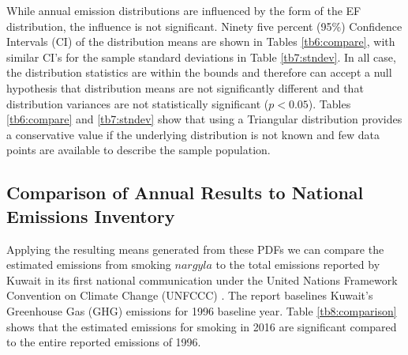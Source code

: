 \begin{table}[]
\centering
\caption{Comparison of annual total emission standard deviations.}
\label{tb7:stndev}
\end{table}

While annual emission distributions are influenced by the form of the EF distribution, the influence is not significant. Ninety five percent (95\%) Confidence Intervals (CI) of the distribution means are shown in Tables \ref{tb6:compare}, with similar CI’s for the sample standard deviations in Table \ref{tb7:stndev}. In all case, the distribution statistics are within the bounds and therefore can accept a null hypothesis that distribution means are not significantly different and that distribution variances are not statistically significant ($p<0.05$).  Tables \ref{tb6:compare} and \ref{tb7:stndev} show that using a Triangular distribution provides a conservative value if the underlying distribution is not known and few data points are available to describe the sample population.  

\subsection{Comparison of Annual Results to National Emissions Inventory}
Applying the resulting means generated from these PDFs we can compare the estimated emissions from smoking $nargyla$ to the total emissions reported by Kuwait in its first national communication under the United Nations Framework Convention on Climate Change (UNFCCC) \citep{AlMudhhi2012}.  The report baselines Kuwait’s Greenhouse Gas (GHG) emissions for 1996 baseline year.  Table \ref{tb8:comparison} shows that the estimated emissions for smoking in 2016 are significant compared to the entire reported emissions of 1996. 


